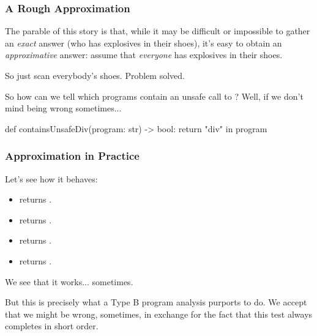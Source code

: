 \documentclass[aspectratio=169, handout]{beamer}
\newcommand{\cmark}{{\color{green!80!black}\ding{51}}}
\newcommand{\xmark}{{\color{red}\ding{55}}}
\begin{document}
\begin{frame}[fragile]
  \frametitle{A Rough Approximation}

  The parable of this story is that, while it may be difficult or impossible to
  gather an \textit{exact} answer (who has explosives in their shoes), it's easy
  to obtain an \textit{approximative} answer: assume that \textit{everyone} has
  explosives in their shoes.

  \pause
  \vspace{\fill}

  So just scan everybody's shoes. Problem solved.

  \pause
  \vspace{\fill}

  So how can we tell which programs contain an unsafe call to ? Well,
  if we don't mind being wrong sometimes...

  \pause
  \vspace{\fill}

  \begin{codeblock}[language=python]
    def containsUnsafeDiv(program: str) -> bool:
      return "div" in program
  \end{codeblock}
\end{frame}

\begin{frame}[fragile]
  \frametitle{Approximation in Practice}

  Let's see how it behaves:

  \begin{itemize}
    \item {} returns . \cmark \pause
    \item {} returns . \cmark \pause
    \item {} returns . \xmark \pause
    \item {} returns . \xmark
  \end{itemize}

  \pause
  \vspace{\fill}

  We see that it works... sometimes.

  \pause
  \vspace{\fill}

  But this is precisely what a Type B program analysis purports to do. We accept
  that we might be wrong, sometimes, in exchange for the fact that this test always
  completes in short order.
\end{frame}
\end{document}
